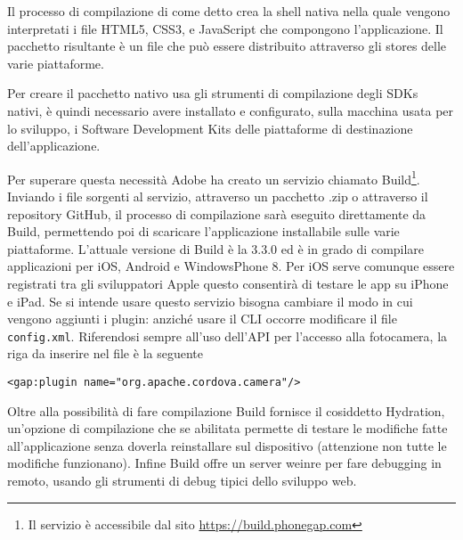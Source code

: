             Il processo di compilazione di \pg{} come detto
            crea la shell nativa nella quale vengono interpretati i file HTML5, CSS3, e
            JavaScript che compongono l'applicazione. Il pacchetto
            risultante è un file che può essere distribuito attraverso gli stores
            delle varie piattaforme.

            Per creare il pacchetto nativo \pg{} usa gli strumenti di compilazione
            degli SDKs nativi, è quindi necessario avere installato e configurato,
            sulla macchina
            usata per lo sviluppo, i Software Development Kits delle piattaforme
            di destinazione dell'applicazione.

            Per superare questa necessità Adobe ha creato un servizio chiamato
            \pg{} Build\footnote{Il servizio è accessibile dal sito
            \url{https://build.phonegap.com}}.
            Inviando i file sorgenti al servizio, attraverso un
            pacchetto .zip o attraverso il repository GitHub, il processo di
            compilazione sarà eseguito direttamente da \pg{} Build, permettendo
            poi di scaricare l'applicazione installabile sulle varie piattaforme.
            L'attuale versione di \pg{} Build è la 3.3.0 ed è in grado di compilare
            applicazioni per iOS, Android e WindowsPhone 8. Per iOS serve comunque
            essere registrati tra gli sviluppatori Apple questo consentirà di
            testare le app su iPhone e iPad.
            Se si intende usare questo servizio bisogna cambiare il modo in cui
            vengono aggiunti i plugin: anziché usare il CLI occorre modificare
            il file \verb|config.xml|. Riferendosi sempre all'uso dell'API per
            l'accesso alla fotocamera, la riga da inserire nel file è la seguente
    \begin{lstlisting}[]
  <gap:plugin name="org.apache.cordova.camera"/>
    \end{lstlisting}

            Oltre alla possibilità di fare compilazione \pg{} Build fornisce
            il cosiddetto Hydration, un'opzione di compilazione che se abilitata
            permette di testare le modifiche fatte all'applicazione senza doverla
            reinstallare sul dispositivo (attenzione non tutte le modifiche
            funzionano). Infine \pg{} Build offre un server weinre per fare
            debugging in remoto, usando gli strumenti di debug tipici dello
            sviluppo web.

